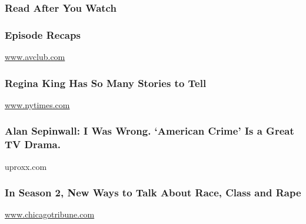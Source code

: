 \hypertarget{read-after-you-watch}{%
\subsubsection{Read After You Watch}\label{read-after-you-watch}}

\href{http://www.avclub.com/tv/american-crime/}{}

\hypertarget{episode-recaps}{%
\subsubsection{Episode Recaps}\label{episode-recaps}}

\href{http://www.avclub.com}{www.avclub.com}

\href{https://www.nytimes.com/2016/03/06/arts/television/regina-king-profile.html}{}

\hypertarget{regina-king-has-so-many-stories-to-tell}{%
\subsubsection{Regina King Has So Many Stories to
Tell}\label{regina-king-has-so-many-stories-to-tell}}

\href{http://www.nytimes.com}{www.nytimes.com}

\href{http://uproxx.com/sepinwall/i-was-wrong-american-crime-is-a-great-tv-drama/}{}

\hypertarget{alan-sepinwall-i-was-wrong-american-crime-is-a-great-tv-drama}{%
\subsubsection{Alan Sepinwall: I Was Wrong. `American Crime' Is a Great
TV
Drama.}\label{alan-sepinwall-i-was-wrong-american-crime-is-a-great-tv-drama}}

uproxx.com

\href{http://www.chicagotribune.com/entertainment/tv/ct-american-crime-finale-racism-and-class-20160310-story.html}{}

\hypertarget{in-season-2-new-ways-to-talk-about-race-class-and-rape}{%
\subsubsection{In Season 2, New Ways to Talk About Race, Class and
Rape}\label{in-season-2-new-ways-to-talk-about-race-class-and-rape}}

\href{http://www.chicagotribune.com}{www.chicagotribune.com}

